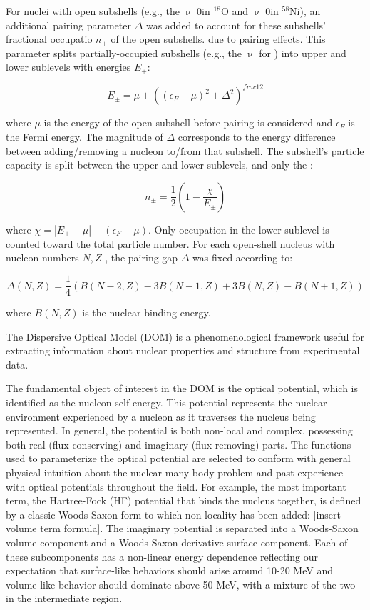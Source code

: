 For nuclei with open subshells (e.g., the $\upnu$ 0\dFive in $^{18}$O and
$\upnu$ 0\fFive in $^{58}$Ni), an additional
pairing parameter $\Delta$ was added to
account for these subshells' fractional occupatio $n_{\pm}$ of the open subshells. due to pairing
effects. This parameter splits partially-occupied subshells (e.g., the $\upnu$\dFive
for \oEight) into upper and lower sublevels with energies $E_{\pm}$:

\begin{equation}
    E_{\pm} = \mu \pm ((\epsilon_{F}-\mu)^{2} + \Delta^{2})^{frac{1}{2}}
\end{equation}

where $\mu$ is the energy of the open subshell before pairing is considered and
$\epsilon_{F}$ is the Fermi
energy. The magnitude of $\Delta$ corresponds to the energy difference between
adding/removing a nucleon to/from that subshell. The subshell's particle
capacity is split between the upper and lower sublevels, and only the :

\begin{equation}
    n_{\pm} = \frac{1}{2}\left( 1-\frac{\chi}{E_{\pm}}\right)
\end{equation}

where $\chi = |E_{\pm}-\mu| - (\epsilon_{F} - \mu)$. Only occupation in the
lower sublevel is counted toward the total particle number. For each open-shell
nucleus with nucleon numbers $N, Z$ , the pairing gap $\Delta$ was fixed according to:

\begin{equation}
    \Delta(N,Z) = \frac{1}{4}\left(B(N-2,Z)-3B(N-1,Z) + 3B(N,Z)-B(N+1,Z)\right)
\end{equation}

where $B(N,Z)$ is the nuclear binding energy.

The Dispersive Optical Model (DOM) is a phenomenological framework useful for 
extracting information about nuclear properties and structure from experimental
data.

The fundamental object of interest in the DOM is the \Gls{optical potential},
which is identified as the \Gls{nucleon self-energy}. This potential represents
the nuclear environment experienced
by a nucleon as it traverses the nucleus being represented. In general, the
potential is both non-local and complex, possessing both real (flux-conserving)
and imaginary (flux-removing) parts. The functions used to parameterize the optical potential
are selected to conform with general physical intuition about the nuclear
many-body problem and past experience with optical potentials throughout the
field. For example, the most important term, the Hartree-Fock (HF) potential
that binds the nucleus together, is defined by a classic Woods-Saxon form to
which non-locality has been added: [insert volume term formula]. The imaginary
potential is separated into a Woods-Saxon volume component and a
Woods-Saxon-derivative surface component. Each of these subcomponents has
a non-linear energy dependence reflecting our expectation that surface-like
behaviors should arise around 10-20 MeV and volume-like behavior should dominate
above 50 MeV, with a mixture of the two in the intermediate region.

